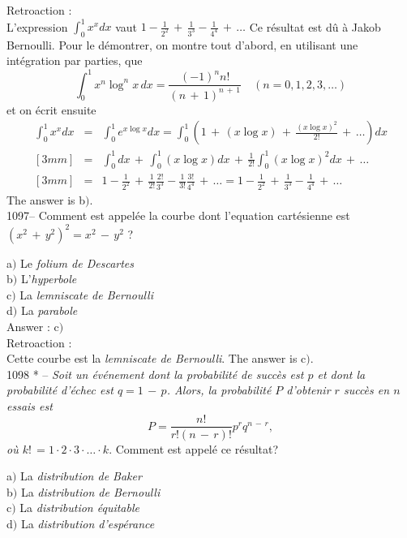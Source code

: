﻿\documentclass[letterpaper, 12pt]{article}
\begin{document}
Retroaction : \\
L'expression $\int_0^1x^xdx$ vaut
$1-\frac1{2^2}\,+\,\frac1{3^3}-\frac1{4^4}\,+\,\ldots$ Ce r\'esultat
est d\^u \`a Jakob Bernoulli. Pour le d\'emontrer, on montre tout
d'abord, en utilisant une int\'egration par parties, que
$$\displaystyle{\int_0^1x^n\log^nx\,dx=\frac{(-1)^nn!}{(n\,+\,1)^{n\,+\,1}}\quad(n=0,1,2,3,\ldots)}$$
et on \'ecrit ensuite
\begin{eqnarray*}
\int_0^1x^xdx & = & \displaystyle{\int_0^1e^{x\log
x}dx=\int_0^1\left(1\,+\,(x\log x)\,+\,\frac{(x\log
x)^2}{2!}\,+\,\ldots\right)dx} \\ [3mm]
              & = & \displaystyle{\int_0^1dx\,+\,\int_0^1(x\log
x)dx\,+\,\frac1{2!}\int_0^1(x\log x)^2dx\,+\,\ldots} \\ [3mm]
              & = &
\displaystyle{1-\frac1{2^2}\,+\,\frac1{2!}\frac{2!}{3^3}-\frac1{3!}\frac{3!}{4^4}\,+\,\ldots=1-\frac1{2^2}\,+\,\frac1{3^3}-\frac1{4^4}\,+\,\ldots}
\end{eqnarray*}
The answer is b$)$.\\

1097-- Comment est appel\'ee la courbe dont l'equation
cart\'esienne est $(x^2\,+\,y^2)^2=x^2\,-\,y^2$ ?

a$)$ Le {\sl folium de Descartes} \\
b$)$ L'{\sl hyperbole}  \\
c$)$ La {\sl lemniscate de Bernoulli}  \\
d$)$ La {\sl parabole}\\

Answer : c$)$\\

Retroaction : \\
Cette courbe est la {\sl lemniscate de Bernoulli}.
The answer is c$)$.\\

1098 * -- {\sl Soit un \'ev\'enement dont la probabilit\'e de
succ\`es est $p$ et dont la probabilit\'e d'\'echec est $q=1\,-\,p$.
Alors, la probabilit\'e $P$ d'obtenir $r$ succ\`es en $n$ essais est
$$\displaystyle{P=\frac{n!}{r!(n\,-\,r)!}p^rq^{n\,-\,r}},$$
o\`u $k!\,=1\cdot2\cdot3\cdot\ldots\cdot k$}. Comment est appel\'e
ce r\'esultat?

a$)$ La {\sl distribution de Baker} \\
b$)$ La {\sl distribution de Bernoulli}   \\
c$)$ La {\sl distribution \'equitable}  \\
d$)$ La {\sl distribution d'esp\'erance}\\
\end{document}

